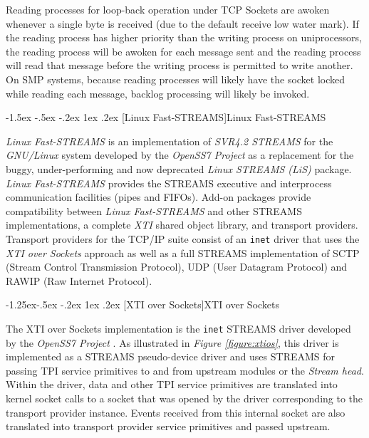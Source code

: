 \documentclass[letterpaper,final,notitlepage,twocolumn,10pt,twoside]{article}
\makeatletter
\let\normalsize = \small
\let\small = \footnotesize
\let\footnotesize = \scriptsize
\let\scriptsize = \tiny
\renewcommand\subsection{\@startsection{subsection}{2}{\z@}%
                                     {-1.5ex \@plus -.5ex \@minus -.2ex}%
                                     {1ex \@plus .2ex}%
                                     {\normalfont\normalsize\bfseries}}
\renewcommand\subsubsection{\@startsection{subsubsection}{3}{\z@}%
                                     {-1.25ex\@plus -.5ex \@minus -.2ex}%
                                     {1ex \@plus .2ex}%
                                     {\normalfont\normalsize\bfseries}}
\makeatother
\begin{document}
Reading processes for loop-back operation under TCP Sockets are awoken whenever a single byte is received
(due to the default receive low water mark).  If the reading process has higher priority than the
writing process on uniprocessors, the reading process will be awoken for each message sent and the
reading process will read that message before the writing process is permitted to write another.  On
SMP systems, because reading processes will likely have the socket locked while reading each
message, backlog processing will likely be invoked.

\subsection[Linux Fast-STREAMS]{Linux Fast-STREAMS}

\textsl{Linux Fast-STREAMS} is an implementation of \textsl{SVR4.2 STREAMS} for the
\textsl{GNU/Linux} system developed by the \textsl{OpenSS7 Project} \cite[]{openss7} as a
replacement for the buggy, under-performing and now deprecated \textsl{Linux STREAMS (LiS)} package.
\textsl{Linux Fast-STREAMS} provides the STREAMS executive and interprocess communication facilities
(pipes and FIFOs).  Add-on packages provide compatibility between \textsl{Linux Fast-STREAMS} and
other STREAMS implementations, a complete \textsl{XTI} shared object library, and transport
providers.  Transport providers for the TCP/IP suite consist of an \texttt{inet} driver that uses
the \textit{XTI over Sockets} approach as well as a full STREAMS implementation of SCTP (Stream
Control Transmission Protocol), UDP (User Datagram Protocol) and RAWIP (Raw Internet Protocol).

\subsubsection[XTI over Sockets]{XTI over Sockets}
\label{section:xtios}

The XTI over Sockets implementation is the \texttt{inet} STREAMS driver developed by the
\textsl{OpenSS7 Project} \cite[]{openss7}. As illustrated in \textit{Figure \ref{figure:xtios}},
this driver is implemented as a STREAMS pseudo-device driver and uses STREAMS for passing TPI
service primitives to and from upstream modules or the \textit{Stream head}.  Within the driver,
data and other TPI service primitives are translated into kernel socket calls to a socket that was
opened by the driver corresponding to the transport provider instance.  Events received from this
internal socket are also translated into transport provider service primitives and passed upstream.
\end{document}
